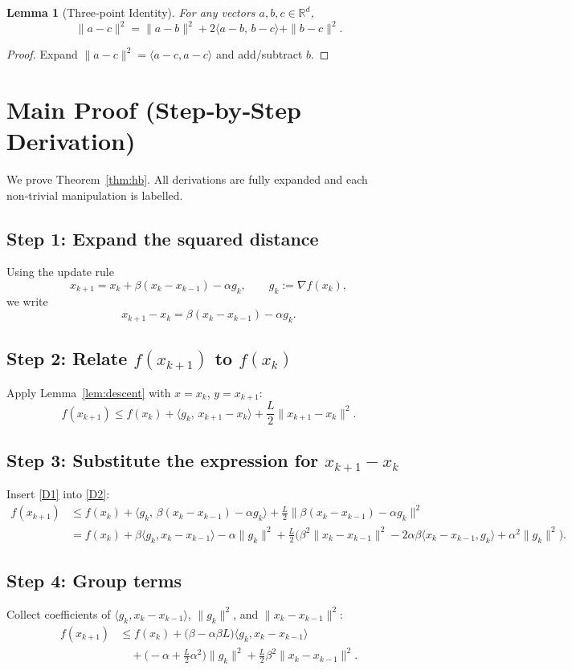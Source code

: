 \documentclass{article}
\newtheorem{lemma}{Lemma}[section]
\newcommand{\grad}{\nabla}
\begin{document}
\begin{lemma}[Three‑point Identity]\label{lem:three}
For any vectors $a,b,c\in\mathbb{R}^d$,
\[
\|a-c\|^2 = \|a-b\|^2 + 2\langle a-b,\,b-c\rangle + \|b-c\|^2 .
\tag{C2}
\]
\end{lemma}
\begin{proof}
Expand $\|a-c\|^2 = \langle a-c, a-c\rangle$ and add/subtract $b$. \qedhere
\end{proof}

\section*{Main Proof (Step‑by‑Step Derivation)}
We prove Theorem~\ref{thm:hb}.  All derivations are fully expanded and each non‑trivial manipulation is labelled.

\subsection*{Step 1: Expand the squared distance}
Using the update rule
\[
x_{k+1}=x_k+\beta (x_k-x_{k-1})-\alpha g_k,\qquad g_k:=\grad f(x_k),
\]
we write
\[
x_{k+1}-x_k = \beta (x_k-x_{k-1})-\alpha g_k .
\tag{D1}
\]

\subsection*{Step 2: Relate $f(x_{k+1})$ to $f(x_k)$}
Apply Lemma~\ref{lem:descent} with $x=x_k$, $y=x_{k+1}$:
\[
f(x_{k+1})\le f(x_k)+\langle g_k,\,x_{k+1}-x_k\rangle
            +\frac{L}{2}\|x_{k+1}-x_k\|^2 .
\tag{D2}
\]

\subsection*{Step 3: Substitute the expression for $x_{k+1}-x_k$}
Insert \eqref{D1} into \eqref{D2}:
\[
\begin{aligned}
f(x_{k+1})
&\le f(x_k)+\langle g_k,\,\beta (x_k-x_{k-1})-\alpha g_k\rangle
      +\frac{L}{2}\|\beta (x_k-x_{k-1})-\alpha g_k\|^2\\
&= f(x_k)+\beta\langle g_k, x_k-x_{k-1}\rangle
      -\alpha\|g_k\|^2
      +\frac{L}{2}\bigl(\beta^2\|x_k-x_{k-1}\|^2
            -2\alpha\beta\langle x_k-x_{k-1},g_k\rangle
            +\alpha^2\|g_k\|^2\bigr).
\end{aligned}
\tag{D3}
\]

\subsection*{Step 4: Group terms}
Collect coefficients of $\langle g_k, x_k-x_{k-1}\rangle$, $\|g_k\|^2$, and $\|x_k-x_{k-1}\|^2$:
\[
\begin{aligned}
f(x_{k+1})
&\le f(x_k)
   +\bigl(\beta-\alpha\beta L\bigr)\langle g_k, x_k-x_{k-1}\rangle   \\
&\quad +\bigl(-\alpha +\tfrac{L}{2}\alpha^2\bigr)\|g_k\|^2
   +\tfrac{L}{2}\beta^2\|x_k-x_{k-1}\|^2 .
\end{aligned}
\tag{D4}
\]
\end{document}
